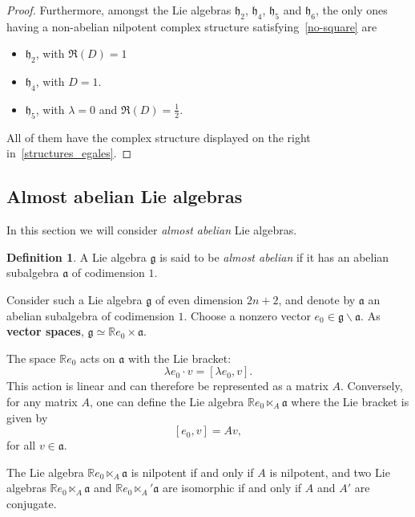 \documentclass[leqno]{article}
\theoremstyle{definition}
\newtheorem{Definition}[equation]{Definition}
\numberwithin{equation}{section}
\begin{document}
\begin{proof}
Furthermore, amongst the Lie algebras $\mathfrak{h}_2$, $\mathfrak{h}_4$, $\mathfrak{h}_5$ and $\mathfrak{h}_6$, the only ones having a non-abelian nilpotent complex structure satisfying~\ref{no-square} are 
\begin{itemize}
\item $\mathfrak{h}_2$, with $\Re (D) = 1$
\item $\mathfrak{h}_4$, with $D=1$.
\item $\mathfrak{h}_5$, with $\lambda = 0$ and $\Re (D) = \frac{1}{2}$.
\end{itemize}
All of them have the complex structure displayed on the right in~\ref{structures_egales}.
\end{proof}

\subsection{Almost abelian Lie algebras}
In this section we will consider {\sl almost abelian} Lie algebras.
\begin{Definition}
A Lie algebra $\mathfrak{g}$ is said to be {\sl almost abelian} if it has an abelian subalgebra $\mathfrak{a}$ of codimension $1$.
\end{Definition}
Consider such a Lie algebra $\mathfrak{g}$ of even dimension $2n+2$, and denote by $\mathfrak{a}$ an abelian subalgebra of codimension $1$. Choose a nonzero vector $e_0 \in \mathfrak{g} \backslash \mathfrak{a}$. As {\bf vector spaces}, $\mathfrak{g} \simeq \mathbb{R}e_0 \times \mathfrak{a}$. 

The space $\mathbb{R}e_0$ acts on $\mathfrak{a}$ with the Lie bracket:
\[
\lambda e_0 \cdot v
=
[\lambda e_0, v].
\]
This action is linear and can therefore be represented as a matrix $A$. Conversely, for any matrix $A$, one can define the Lie algebra $\mathbb{R}e_0 \ltimes_A \mathfrak{a}$ where the Lie bracket is given by
\[
[e_0, v] = Av,
\]
for all $v \in \mathfrak{a}$. 

The Lie algebra $\mathbb{R}e_0 \ltimes_A \mathfrak{a}$ is nilpotent if and only if $A$ is nilpotent, and two Lie algebras $\mathbb{R}e_0 \ltimes_A \mathfrak{a}$ and $\mathbb{R}e_0 \ltimes_A' \mathfrak{a}$ are isomorphic if and only if $A$ and $A'$ are conjugate.
\end{document}
